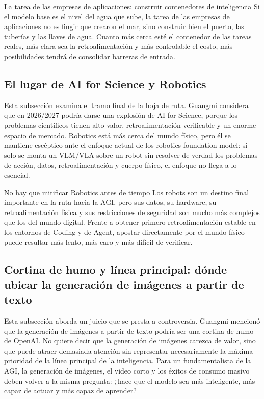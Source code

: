 \begin{importantbox}{La tarea de las empresas de aplicaciones: construir contenedores de inteligencia}
Si el modelo base es el nivel del agua que sube, la tarea de las empresas de aplicaciones no es fingir que crearon el mar, sino construir bien el puerto, las tuberías y las llaves de agua. Cuanto más cerca esté el contenedor de las tareas reales, más clara sea la retroalimentación y más controlable el costo, más posibilidades tendrá de consolidar barreras de entrada.
\end{importantbox}

\subsection{El lugar de AI for Science y Robotics}

Esta subsección examina el tramo final de la hoja de ruta. Guangmi considera que en 2026/2027 podría darse una explosión de AI for Science, porque los problemas científicos tienen alto valor, retroalimentación verificable y un enorme espacio de mercado. Robotics está más cerca del mundo físico, pero él se mantiene escéptico ante el enfoque actual de los robotics foundation model: si solo se monta un VLM/VLA sobre un robot sin resolver de verdad los problemas de acción, datos, retroalimentación y cuerpo físico, el enfoque no llega a lo esencial.

\begin{warningbox}{No hay que mitificar Robotics antes de tiempo}
Los robots son un destino final importante en la ruta hacia la AGI, pero sus datos, su hardware, su retroalimentación física y sus restricciones de seguridad son mucho más complejos que los del mundo digital. Frente a obtener primero retroalimentación estable en los entornos de Coding y de Agent, apostar directamente por el mundo físico puede resultar más lento, más caro y más difícil de verificar.
\end{warningbox}

\subsection{Cortina de humo y línea principal: dónde ubicar la generación de imágenes a partir de texto}

Esta subsección aborda un juicio que se presta a controversia. Guangmi mencionó que la generación de imágenes a partir de texto podría ser una cortina de humo de OpenAI. No quiere decir que la generación de imágenes carezca de valor, sino que puede atraer demasiada atención sin representar necesariamente la máxima prioridad de la línea principal de la inteligencia. Para un fundamentalista de la AGI, la generación de imágenes, el video corto y los éxitos de consumo masivo deben volver a la misma pregunta: ¿hace que el modelo sea más inteligente, más capaz de actuar y más capaz de aprender?

